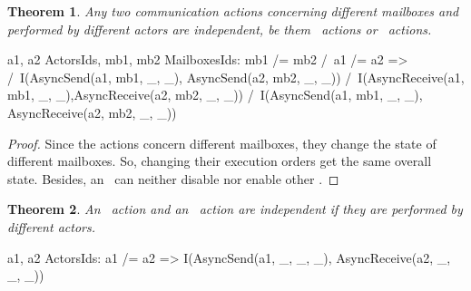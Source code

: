 \documentclass[a4paper,11pt]{article}
\theoremstyle{break}
\newtheorem{theorem}{Theorem}[section]
\begin{document}
\begin{theorem}\label{th:differingMailbox}
Any two communication actions concerning different mailboxes and performed by different actors are independent, be them \asynsend~actions or \asynreceive~actions.
\end{theorem}
\begin{tla}
\forall a1, a2 \in ActorsIds, mb1, mb2 \in MailboxesIds:
mb1 /= mb2 /\ a1 /= a2 =>
		/\ I(AsyncSend(a1, mb1, _, _), AsyncSend(a2, mb2, _, _))
		/\ I(AsyncReceive(a1, mb1, _, _),AsyncReceive(a2, mb2, _, _))
		/\ I(AsyncSend(a1, mb1, _, _), AsyncReceive(a2, mb2, _, _))
\end{tla}
\begin{tlatex}
%
\end{tlatex}

\begin{proof}
Since the actions concern different mailboxes, they change the state of different mailboxes. So, changing their execution orders get the same overall state. Besides, an \asynsend~can neither disable nor enable other \asynsend. 
\end{proof}

\begin{theorem}
An \asynsend~action and an \asynreceive~action are independent if they are performed by different actors.
\end{theorem}

\begin{tla}
	
\forall a1, a2 \in ActorsIds: a1 /= a2 
		=> I(AsyncSend(a1, _, _, _), AsyncReceive(a2, _, _, _))
\end{tla}
\begin{tlatex}
%
\end{tlatex}
\end{document}
